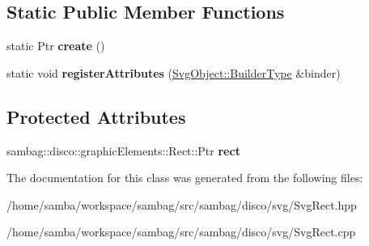 \subsection*{Static Public Member Functions}
\begin{DoxyCompactItemize}
\item 
\hypertarget{classsambag_1_1disco_1_1svg_1_1_svg_rect_aef9401a232a2222cfaa23405833ce3c0}{
static Ptr {\bfseries create} ()}
\label{classsambag_1_1disco_1_1svg_1_1_svg_rect_aef9401a232a2222cfaa23405833ce3c0}

\item 
\hypertarget{classsambag_1_1disco_1_1svg_1_1_svg_rect_af04b290fa1361836ebe9eb1b7477bbe3}{
static void {\bfseries registerAttributes} (\hyperlink{classsambag_1_1xml_1_1_x_m_l2_object}{SvgObject::BuilderType} \&binder)}
\label{classsambag_1_1disco_1_1svg_1_1_svg_rect_af04b290fa1361836ebe9eb1b7477bbe3}

\end{DoxyCompactItemize}
\subsection*{Protected Attributes}
\begin{DoxyCompactItemize}
\item 
\hypertarget{classsambag_1_1disco_1_1svg_1_1_svg_rect_a30b08002c5cfeef24733fa07c9897e6d}{
sambag::disco::graphicElements::Rect::Ptr {\bfseries rect}}
\label{classsambag_1_1disco_1_1svg_1_1_svg_rect_a30b08002c5cfeef24733fa07c9897e6d}

\end{DoxyCompactItemize}


The documentation for this class was generated from the following files:\begin{DoxyCompactItemize}
\item 
/home/samba/workspace/sambag/src/sambag/disco/svg/SvgRect.hpp\item 
/home/samba/workspace/sambag/src/sambag/disco/svg/SvgRect.cpp\end{DoxyCompactItemize}
